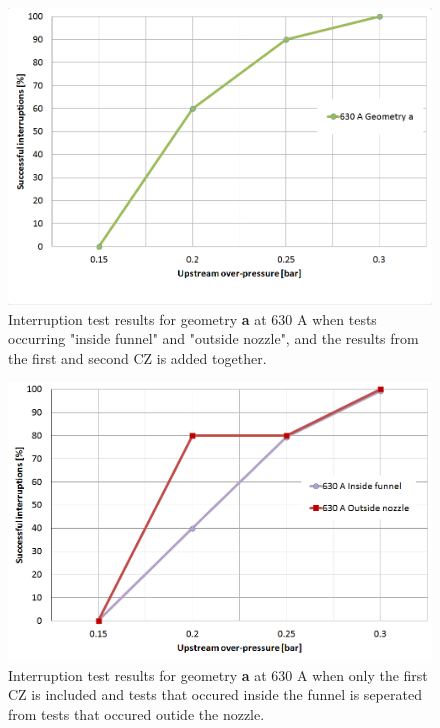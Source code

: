 \documentclass[10pt,b5paper,twoside]{article}
\begin{document}
\begin{figure}[H]
\centering
\includegraphics[scale=0.45]{Bilder/Results/geoA630amp_riktig.PNG}
\caption{Interruption test results for geometry \textbf{a} at 630 A when tests occurring "inside funnel" and "outside nozzle", and the results from the first and second CZ is added together.} \label{fig:results630AgeoA}
\end{figure}

\begin{figure}[H]
\centering
\includegraphics[scale=0.45]{Bilder/Results/geoA630ampcomp.PNG}
\caption{Interruption test results for geometry \textbf{a} at 630 A when only the first CZ is included and tests that occured inside the funnel is seperated from tests that occured outide the nozzle.} \label{fig:results630AgeoAcomp}
\end{figure}
\end{document}
